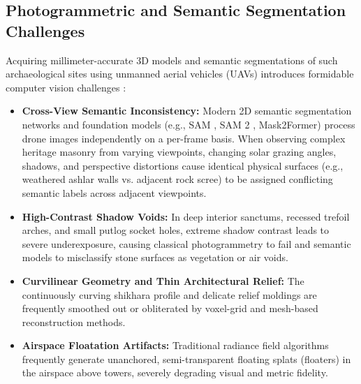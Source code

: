 \documentclass[11pt,a4paper]{article}
\begin{document}
\subsection{Photogrammetric and Semantic Segmentation Challenges}
Acquiring millimeter-accurate 3D models and semantic segmentations of such archaeological sites using unmanned aerial vehicles (UAVs) introduces formidable computer vision challenges \cite{fadilah2024multiview}:
\begin{itemize}
    \item \textbf{Cross-View Semantic Inconsistency:} Modern 2D semantic segmentation networks and foundation models (e.g., SAM \cite{kirillov2023segment}, SAM 2 \cite{ravi2024sam2}, Mask2Former) process drone images independently on a per-frame basis. When observing complex heritage masonry from varying viewpoints, changing solar grazing angles, shadows, and perspective distortions cause identical physical surfaces (e.g., weathered ashlar walls vs. adjacent rock scree) to be assigned conflicting semantic labels across adjacent viewpoints.
    \item \textbf{High-Contrast Shadow Voids:} In deep interior sanctums, recessed trefoil arches, and small putlog socket holes, extreme shadow contrast leads to severe underexposure, causing classical photogrammetry to fail and semantic models to misclassify stone surfaces as vegetation or air voids.
    \item \textbf{Curvilinear Geometry and Thin Architectural Relief:} The continuously curving shikhara profile and delicate relief moldings are frequently smoothed out or obliterated by voxel-grid and mesh-based reconstruction methods.
    \item \textbf{Airspace Floatation Artifacts:} Traditional radiance field algorithms frequently generate unanchored, semi-transparent floating splats (floaters) in the airspace above towers, severely degrading visual and metric fidelity.
\end{itemize}
\end{document}
